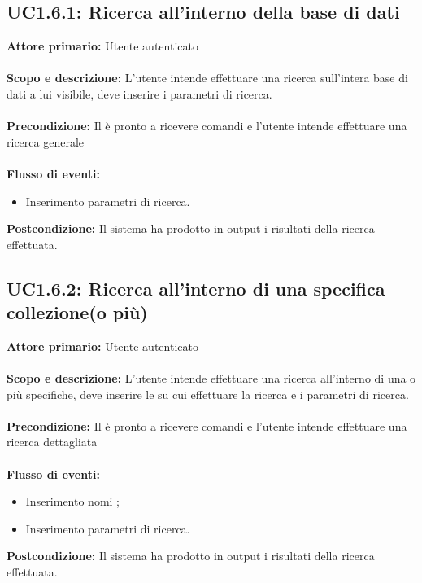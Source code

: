 \documentclass{scalatekids-article}
\begin{document}
\subsection{UC1.6.1: Ricerca all'interno della base di dati}
\textbf{Attore primario:} Utente autenticato \\ \\
\textbf{Scopo e descrizione:} L’utente intende effettuare una ricerca sull’intera base di dati a lui visibile, deve inserire i parametri di ricerca.\\ \\
\textbf{Precondizione:} Il  è pronto a ricevere comandi e l’utente intende effettuare una ricerca generale\\ \\
\textbf{Flusso di eventi:}
\begin{itemize}
\item Inserimento parametri di ricerca.
\end{itemize}
\textbf{Postcondizione:} Il sistema ha prodotto in output i risultati della ricerca effettuata.
\subsection{UC1.6.2: Ricerca all'interno di una specifica collezione(o più)}
\textbf{Attore primario:} Utente autenticato \\ \\
\textbf{Scopo e descrizione:} L’utente intende effettuare una ricerca all’interno di una o più  specifiche, deve inserire le  su cui effettuare la ricerca e i parametri di ricerca.\\ \\
\textbf{Precondizione:} Il  è pronto a ricevere comandi e l’utente intende effettuare una ricerca dettagliata\\ \\
\textbf{Flusso di eventi:}
\begin{itemize}
\item Inserimento nomi ;
\item Inserimento parametri di ricerca.
\end{itemize}
\textbf{Postcondizione:} Il sistema ha prodotto in output i risultati della ricerca effettuata.
\end{document}
